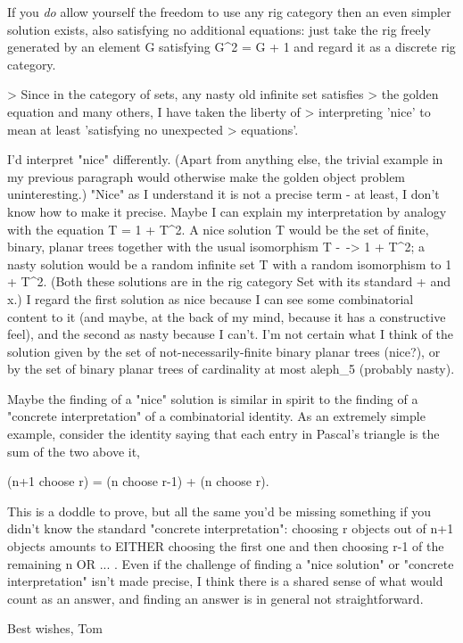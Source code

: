 If you \emph{do} allow yourself the freedom to use any rig category then an
even simpler solution exists, also satisfying no additional equations:
just take the rig freely generated by an element G satisfying G^2 = G +
1 and regard it as a discrete rig category.

>     Since in the category of sets, any nasty old infinite set satisfies
> the golden equation and many others, I have taken the liberty of
> interpreting  'nice' to mean at least 'satisfying no unexpected
> equations'.

I'd interpret "nice" differently.  (Apart from anything else, the
trivial example in my previous paragraph would otherwise make the golden
object problem uninteresting.)  "Nice" as I understand it is not a
precise term - at least, I don't know how to make it precise.  Maybe I
can explain my interpretation by analogy with the equation T = 1 + T^2. 
A nice solution T would be the set of finite, binary, planar trees
together with the usual isomorphism T -~-> 1 + T^2; a nasty solution
would be a random infinite set T with a random isomorphism to 1 + T^2. 
(Both these solutions are in the rig category Set with its standard +
and x.)  I regard the first solution as nice because I can see some
combinatorial content to it (and maybe, at the back of my mind, because
it has a constructive feel), and the second as nasty because I can't. 
I'm not certain what I think of the solution given by the set of
not-necessarily-finite binary planar trees (nice?), or by the set of
binary planar trees of cardinality at most aleph_5 (probably nasty).

Maybe the finding of a "nice" solution is similar in spirit to the
finding of a "concrete interpretation" of a combinatorial identity.  As
an extremely simple example, consider the identity saying that each
entry in Pascal's triangle is the sum of the two above it,

   (n+1 choose r) = (n choose r-1) + (n choose r).

This is a doddle to prove, but all the same you'd be missing something
if you didn't know the standard "concrete interpretation": choosing r
objects out of n+1 objects amounts to EITHER choosing the first one and
then choosing r-1 of the remaining n OR ... .  Even if the challenge of
finding a "nice solution" or "concrete interpretation" isn't made
precise, I think there is a shared sense of what would count as an
answer, and finding an answer is in general not straightforward.

Best wishes,
Tom


